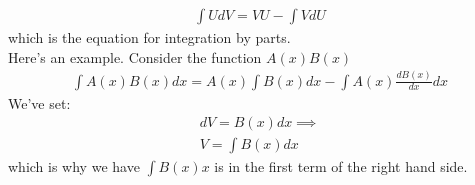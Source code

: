 \documentclass{article}
\begin{document}
\begin{align}
    \int U dV = V U - \int V dU
\end{align}
which is the equation for integration by parts. \\

Here's an example. Consider the function $A(x)B(x)$ 
\begin{align}
    \int A(x) B(x)dx = A(x) \int B(x) dx - \int A(x) \frac{d B(x)}{dx} dx
\end{align}
We've set: 
\begin{align}
    dV = B(x)dx \implies\\
    V = \int B(x) dx
\end{align}
which is why we have $\int B(x) x$ is in the first term of the right hand side.
\end{document}
